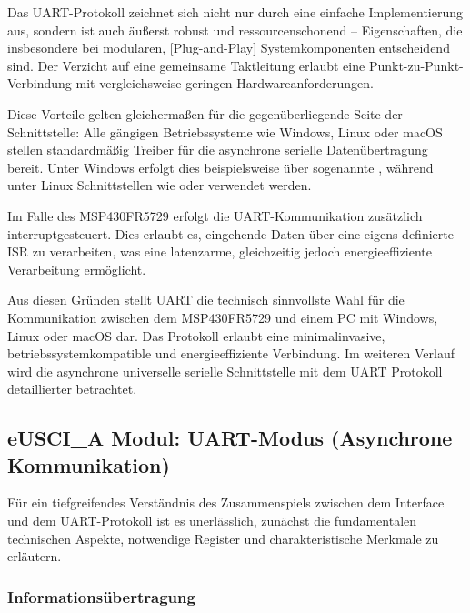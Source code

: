 Das UART-Protokoll zeichnet sich nicht nur durch eine einfache Implementierung aus, sondern ist auch \"au{\ss}erst robust und ressourcenschonend -- Eigenschaften, die insbesondere bei modularen, [Plug-and-Play] Systemkomponenten entscheidend sind. Der Verzicht auf eine gemeinsame Taktleitung erlaubt eine Punkt-zu-Punkt-Verbindung mit vergleichsweise geringen Hardwareanforderungen. 

\newpage
Diese Vorteile gelten gleicherma{\ss}en f\"ur die gegen\"uberliegende Seite der Schnittstelle: Alle g\"angigen Betriebssysteme wie Windows, Linux oder macOS stellen standardm\"a{\ss}ig Treiber f\"ur die asynchrone serielle Daten\"ubertragung bereit. Unter Windows erfolgt dies beispielsweise \"uber sogenannte , w\"ahrend unter Linux Schnittstellen wie  oder  verwendet werden. 

Im Falle des MSP430FR5729 erfolgt die UART-Kommunikation zus\"atzlich interruptgesteuert. Dies erlaubt es, eingehende Daten \"uber eine eigens definierte ISR zu verarbeiten, was eine latenzarme, gleichzeitig jedoch energieeffiziente Verarbeitung erm\"oglicht.

Aus diesen Gr\"unden stellt UART die technisch sinnvollste Wahl f\"ur die Kommunikation zwischen dem MSP430FR5729 und einem PC mit Windows, Linux oder macOS dar. Das Protokoll erlaubt eine minimalinvasive, betriebssystemkompatible und energieeffiziente Verbindung. Im weiteren Verlauf wird die asynchrone universelle serielle Schnittstelle mit dem UART Protokoll detaillierter betrachtet.\AI

\subsection{eUSCI\_A Modul: UART-Modus (Asynchrone Kommunikation)}
\label{sec:eUSCI_UART}

F\"ur ein tiefgreifendes Verst\"andnis des Zusammenspiels zwischen dem Interface und dem UART-Protokoll ist es unerl\"asslich, zun\"achst die fundamentalen technischen Aspekte, notwendige Register und charakteristische Merkmale zu erl\"autern.

\subsubsection{Informations\"ubertragung}
\label{sec:UART_uebertragung}


